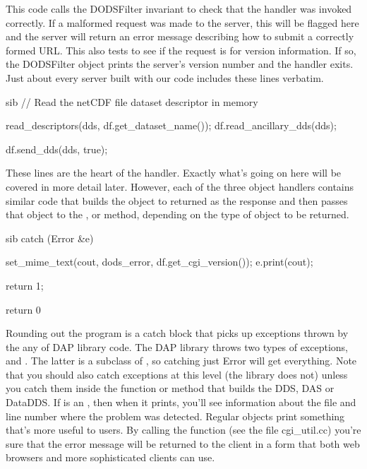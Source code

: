 \documentclass{dods-paper}
\begin{document}
\begin{vcode}{sib}
try {
   if (!df.OK()) {
         df.print_usage();
         return 1
   }
   
   if (df.version()) {
         df.send_version_info();
         return 0;
   }
\end{vcode}  

This code calls the DODSFilter invariant to check that the handler was
invoked correctly. If a malformed request was made to the server, this
will be flagged here and the server will return an error message
describing how to submit a correctly formed URL. This also tests to
see if the request is for version information. If so, the
DODSFilter object prints the server's version number and the handler
exits. Just about every server built with our code includes these
lines verbatim.

\begin{vcode}{sib}  
// Read the netCDF file dataset descriptor in memory

   read_descriptors(dds, df.get_dataset_name());
   df.read_ancillary_dds(dds);

   df.send_dds(dds, true);
\end{vcode}  
 
These lines are the heart of the handler. Exactly what's going on here
will be covered in more detail later. However, each of the three
object handlers contains similar code that builds the object to
returned as the response and then passes that object to the
,  or 
method, depending on the type of object to be returned.

\begin{vcode}{sib} 
catch (Error &e) {
        set_mime_text(cout, dods_error, df.get_cgi_version());
        e.print(cout);

        return 1;
       }

       return 0
\end{vcode}
  
Rounding out the program is a catch block that picks up exceptions thrown by
the any of DAP library code. The DAP library throws two types of exceptions,
 and . The latter is a subclass of ,
so catching just Error will get everything. Note that you should also catch
 exceptions at this level (the library does not) unless you
catch them inside the function or method that builds the DDS, DAS or DataDDS.
If  is an , then when it prints, you'll see
information about the file and line number where the problem was detected.
Regular  objects print something that's more useful to users. By
calling the  function (see the file cgi\_util.cc) you're
sure that the error message will be returned to the client in a form that
both web browsers and more sophisticated clients can use.
\end{document}
